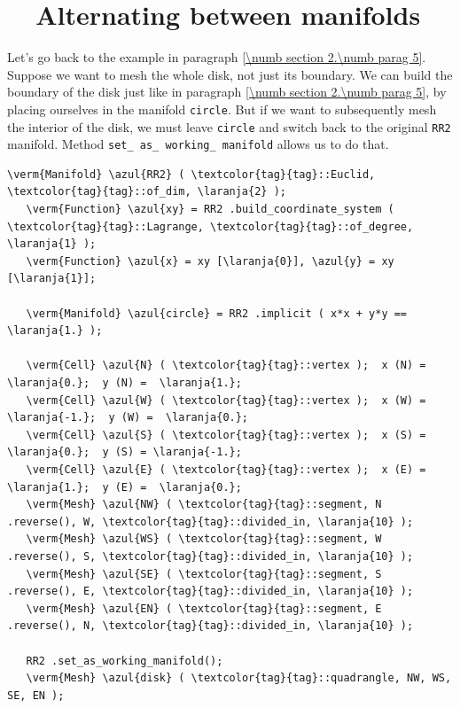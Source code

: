 \section{~~Alternating between manifolds}\label{\numb section 2.\numb parag 9}

Let's go back to the example in paragraph \ref{\numb section 2.\numb parag 5}.
Suppose we want to mesh the whole disk, not just its boundary.
We can build the boundary of the disk just like in paragraph
\ref{\numb section 2.\numb parag 5}, by placing ourselves in the manifold {\small\tt circle}.
But if we want to subsequently mesh the interior of the disk, we must leave {\small\tt circle}
and switch back to the original {\small\tt RR2} manifold.
Method {\small\tt set\_\,as\_\,working\_\,manifold} allows us to do that.

\begin{Verbatim}[commandchars=\\\{\},formatcom=\small\tt,frame=single,
   label=parag-\ref{\numb section 2.\numb parag 9}.cpp,rulecolor=\color{coment},
   baselinestretch=0.94,framesep=2mm]
   \verm{Manifold} \azul{RR2} ( \textcolor{tag}{tag}::Euclid, \textcolor{tag}{tag}::of_dim, \laranja{2} );
   \verm{Function} \azul{xy} = RR2 .build_coordinate_system ( \textcolor{tag}{tag}::Lagrange, \textcolor{tag}{tag}::of_degree, \laranja{1} );
   \verm{Function} \azul{x} = xy [\laranja{0}], \azul{y} = xy [\laranja{1}];
   
   \verm{Manifold} \azul{circle} = RR2 .implicit ( x*x + y*y == \laranja{1.} );
   
   \verm{Cell} \azul{N} ( \textcolor{tag}{tag}::vertex );  x (N) =  \laranja{0.};  y (N) =  \laranja{1.};
   \verm{Cell} \azul{W} ( \textcolor{tag}{tag}::vertex );  x (W) = \laranja{-1.};  y (W) =  \laranja{0.};
   \verm{Cell} \azul{S} ( \textcolor{tag}{tag}::vertex );  x (S) =  \laranja{0.};  y (S) = \laranja{-1.};
   \verm{Cell} \azul{E} ( \textcolor{tag}{tag}::vertex );  x (E) =  \laranja{1.};  y (E) =  \laranja{0.};
   \verm{Mesh} \azul{NW} ( \textcolor{tag}{tag}::segment, N .reverse(), W, \textcolor{tag}{tag}::divided_in, \laranja{10} );
   \verm{Mesh} \azul{WS} ( \textcolor{tag}{tag}::segment, W .reverse(), S, \textcolor{tag}{tag}::divided_in, \laranja{10} );
   \verm{Mesh} \azul{SE} ( \textcolor{tag}{tag}::segment, S .reverse(), E, \textcolor{tag}{tag}::divided_in, \laranja{10} );
   \verm{Mesh} \azul{EN} ( \textcolor{tag}{tag}::segment, E .reverse(), N, \textcolor{tag}{tag}::divided_in, \laranja{10} );
   
   RR2 .set_as_working_manifold();
   \verm{Mesh} \azul{disk} ( \textcolor{tag}{tag}::quadrangle, NW, WS, SE, EN );
\end{Verbatim}

